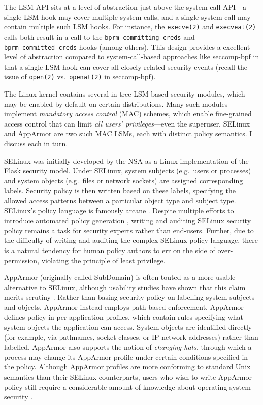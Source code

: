 The LSM API sits at a level of abstraction just above the system call API---a single LSM hook may cover multiple system calls, and a single system call may contain multiple such LSM hooks. For instance, the \texttt{execve(2)} and \texttt{execveat(2)} calls both result in a call to the \texttt{bprm\_committing\_creds} and  \texttt{bprm\_committed\_creds} hooks (among others).  This design provides a excellent level of abstraction compared to system-call-based approaches like seccomp-bpf \cite{seccomp_bpf, drewry2012_seccomp_bpf} in that a single LSM hook can cover all closely related security events (recall the issue of \texttt{open(2)} vs.~\texttt{openat(2)} in seccomp-bpf).

The Linux kernel contains several in-tree LSM-based security modules, which may be enabled by default on certain distributions.  Many such modules implement \textit{mandatory access control} (MAC) schemes, which enable fine-grained access control that can limit \textit{all users' privileges}---even the superuser. SELinux \cite{smalley2001_selinux} and AppArmor \cite{cowan2000_apparmor} are two such MAC LSMs, each with distinct policy semantics. I discuss each in turn.

SELinux \cite{smalley2001_selinux} was initially developed by the NSA as a Linux implementation of the Flask \cite{spencer1999_flask} security model.  Under SELinux, system subjects (e.g.~users or processes) and system objects (e.g.~files or network sockets) are assigned corresponding labels. Security policy is then written based on these labels, specifying the allowed access patterns between a particular object type and subject type. SELinux's policy language is famously arcane \cite{schreuders12_towards}. Despite multiple efforts to introduce automated policy generation \cite{audit2allow, macmillan07_madison, sniffen06_guided}, writing and auditing SELinux security policy remains a task for security experts rather than end-users. Further, due to the difficulty of writing and auditing the complex SELinux policy language, there is a natural tendency for human policy authors to err on the side of over-permission, violating the principle of least privilege.

AppArmor (originally called SubDomain) \cite{cowan2000_apparmor} is often touted as a more usable alternative to SELinux, although usability studies have shown that this claim merits scrutiny \cite{schreuders12_towards}. Rather than basing security policy on labelling system subjects and objects, AppArmor instead employs path-based enforcement. AppArmor defines policy in per-application profiles, which contain rules specifying what system objects the application can access. System objects are identified directly (for example, via pathnames, socket classes, or IP network addresses) rather than labelled.  AppArmor also supports the notion of \textit{changing hats}, through which a process may change its AppArmor profile under certain conditions specified in the policy.  Although AppArmor profiles are more conforming to standard Unix semantics than their SELinux counterparts, users who wish to write AppArmor policy still require a considerable amount of knowledge about operating system security \cite{schreuders12_towards}.

